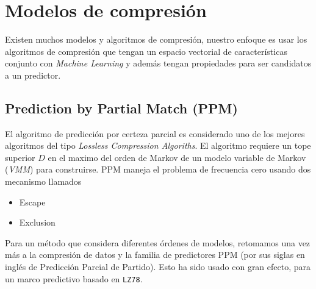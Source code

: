 




\vspace{2cm}
\section{Modelos de compresión}


Existen muchos modelos y algoritmos de compresión, nuestro enfoque es usar los algoritmos de compresión que tengan un espacio vectorial de características conjunto con \emph{Machine Learning} y además tengan propiedades para ser candidatos a un predictor. 







 
\subsection{Prediction by Partial Match (PPM)}
 
El algoritmo de predicción por certeza parcial es considerado uno de los mejores algoritmos del tipo \emph{Lossless Compression Algoriths}. El algoritmo requiere un tope superior $D$ en el maximo del orden de Markov de un modelo variable de Markov (\emph{VMM}) para construirse. 
PPM maneja el problema de frecuencia cero usando dos mecanismo  llamados
	
	\begin{itemize}
			\setlength{\itemsep}{1pt}
			\setlength{\parskip}{0pt}
			\setlength{\parsep}{0pt}
		\item Escape
		\item Exclusion
	\end{itemize}
	
Para un método que considera diferentes órdenes de modelos, retomamos una vez más a la compresión de datos y la familia de predictores PPM  (por sus siglas en inglés de Predicción Parcial de Partido). Esto ha sido usado con gran efecto, para un marco predictivo basado en \texttt{LZ78}. 

